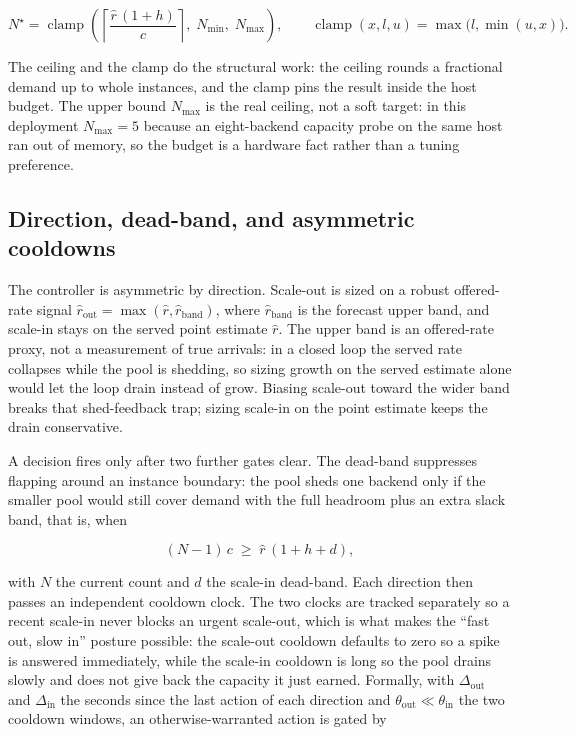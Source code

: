 \begin{equation}\label{bm:eq:target}
  N^{\star} = \operatorname{clamp}\!\left(
    \left\lceil \frac{\hat{r}\,(1+h)}{c} \right\rceil,
    \; N_{\min}, \; N_{\max}
  \right),
  \qquad
  \operatorname{clamp}(x, l, u) = \max\!\big(l, \min(u, x)\big).
\end{equation}

The ceiling and the clamp do the structural work: the ceiling rounds a
fractional demand up to whole instances, and the clamp pins the result inside the
host budget. The upper bound $N_{\max}$ is the real ceiling, not a soft target:
in this deployment $N_{\max}=5$ because an eight-backend capacity probe on the
same host ran out of memory, so the budget is a hardware fact rather than a
tuning preference.

\subsection*{Direction, dead-band, and asymmetric cooldowns}

The controller is asymmetric by direction. Scale-out is sized on a robust
offered-rate signal $\hat{r}_{\text{out}} = \max(\hat{r}, \hat{r}_{\text{band}})$,
where $\hat{r}_{\text{band}}$ is the forecast upper band, and scale-in stays on
the served point estimate $\hat{r}$. The upper band is an offered-rate proxy, not
a measurement of true arrivals: in a closed loop the served rate collapses while
the pool is shedding, so sizing growth on the served estimate alone would let the
loop drain instead of grow. Biasing scale-out toward the wider band breaks that
shed-feedback trap; sizing scale-in on the point estimate keeps the drain
conservative.

A decision fires only after two further gates clear. The dead-band suppresses
flapping around an instance boundary: the pool sheds one backend only if the
smaller pool would still cover demand with the full headroom plus an extra slack
band, that is, when

\begin{equation}\label{bm:eq:deadband}
  (N-1)\,c \;\ge\; \hat{r}\,(1 + h + d),
\end{equation}

with $N$ the current count and $d$ the scale-in dead-band. Each direction then
passes an independent cooldown clock. The two clocks are tracked separately so a
recent scale-in never blocks an urgent scale-out, which is what makes the ``fast
out, slow in'' posture possible: the scale-out cooldown defaults to zero so a
spike is answered immediately, while the scale-in cooldown is long so the pool
drains slowly and does not give back the capacity it just earned. Formally, with
$\Delta_{\text{out}}$ and $\Delta_{\text{in}}$ the seconds since the last action
of each direction and $\theta_{\text{out}} \ll \theta_{\text{in}}$ the two
cooldown windows, an otherwise-warranted action is gated by

